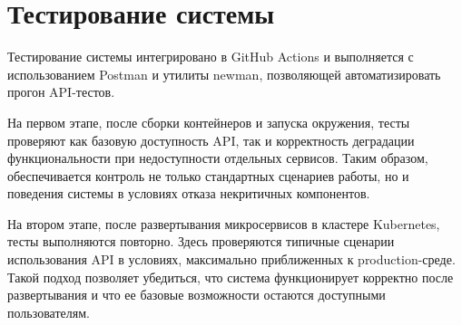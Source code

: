 \section{Тестирование системы}
Тестирование системы интегрировано в GitHub Actions и выполняется с использованием Postman и утилиты newman, позволяющей автоматизировать прогон API-тестов. 

На первом этапе, после сборки контейнеров и запуска окружения, тесты проверяют как базовую доступность API, так и корректность деградации функциональности при недоступности отдельных сервисов. Таким образом, обеспечивается контроль не только стандартных сценариев работы, но и поведения системы в условиях отказа некритичных компонентов.

На втором этапе, после развертывания микросервисов в кластере Kubernetes, тесты выполняются повторно. Здесь проверяются типичные сценарии использования API в условиях, максимально приближенных к production-среде. Такой подход позволяет убедиться, что система функционирует корректно после развертывания и что ее базовые возможности остаются доступными пользователям.
